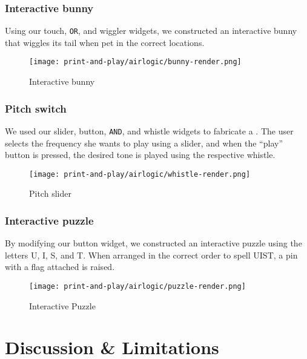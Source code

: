       \subsubsection{Interactive bunny}
        Using our touch, \texttt{OR}, and wiggler widgets, we constructed
        an interactive bunny that wiggles its tail when pet in the
        correct locations.

        \begin{figure}[h]
          \centering
          \texttt{[image: print-and-play/airlogic/bunny-render.png]}
          \caption{Interactive bunny}
          \label{fig:app-bunny}
        \end{figure}
      
      \subsubsection{Pitch switch}
        \label{sec:pitch}
        We used our slider, button, \texttt{AND}, and whistle widgets to
        fabricate a . The user selects the frequency
        she wants to play using a slider, and when the ``play'' button is
        pressed, the desired tone is played using the respective whistle.

        \begin{figure}[h]
          \centering
          \texttt{[image: print-and-play/airlogic/whistle-render.png]}
          \caption{Pitch slider}
          \label{fig:app-slider}
        \end{figure}
      
      \subsubsection{Interactive puzzle}
        \label{sec:puzzle}
        By modifying our button widget, we constructed an interactive
        puzzle using the letters U, I, S, and T. When arranged in the
        correct order to spell UIST, a pin with a flag attached is raised.

        \begin{figure}[h]
          \centering
          \texttt{[image: print-and-play/airlogic/puzzle-render.png]}
          \caption{Interactive Puzzle}
          \label{fig:app-slider}
        \end{figure}
      
  \section{Discussion \& Limitations}
